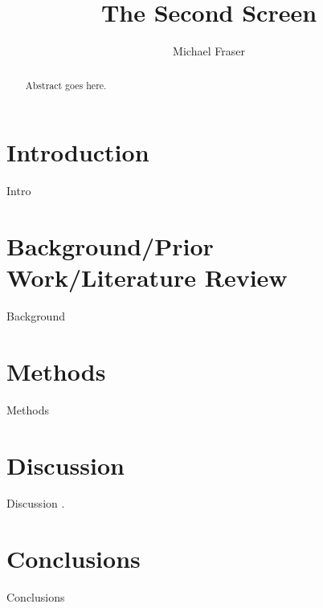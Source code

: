 \documentclass[11pt, oneside]{article}
\begin{document}
\title{The Second Screen}
\author{Michael Fraser}
\maketitle

\begin{abstract}
Abstract goes here. 
\end{abstract}

\tableofcontents

\section{Introduction}
Intro

\section{Background/Prior Work/Literature Review}
Background

\section{Methods}
Methods

\section{Discussion}
Discussion \cite{2003}.

\section{Conclusions}
Conclusions

{}

\end{document}

